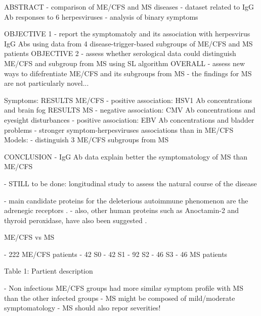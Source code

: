 ABSTRACT
- comparison of ME/CFS and MS diseases
- dataset related to IgG Ab responses to 6 herpesviruses
- analysis of binary symptoms

OBJECTIVE 1
- report the symptomatoly and its association with herpesvirus IgG Abs using data from 4 disease-trigger-based subgroups of ME/CFS and MS patients
OBJECTIVE 2
- assess whether serological data could distinguish ME/CFS and subgroup from MS using SL algorithm
OVERALL
- assess new ways to difefrentiate ME/CFS and its subgroups from MS
- the findings for MS are not particularly novel...


Symptoms:
    RESULTS ME/CFS
    - positive association: HSV1 Ab concentrations and brain fog
    RESULTS MS
    - negative association: CMV Ab concentrations and eyesight disturbances
    - positive association: EBV Ab concentrations and bladder problems
    - stronger symptom-herpesviruses associations than in ME/CFS
Models:
    - distinguish 3 ME/CFS subgroups from MS

CONCLUSION
- IgG Ab data explain better the symptomatology of MS than ME/CFS

- STILL to be done: longitudinal study to assess the natural course of the disease




- main candidate proteins for the deleterious autoimmune phenomenon are the adrenegic receptors \citep{bynke2020AutoantibodiesBetaadrenergic, freitag2021AutoantibodiesVasoregulative, loebel2016AntibodiesAdrenergic}.
- also, other human proteins such as Anoctamin-2 and thyroid peroxidase, have also been suggested \citep{loebel2017SerologicalProfiling, sepulveda2021ImpactGenetic}.

ME/CFS vs MS \citep{loebel2017SerologicalProfiling, ramosRegulatoryNaturalKiller2016}


- 222 ME/CFS patients
    - 42 S0
    - 42 S1
    - 92 S2
    - 46 S3
- 46 MS patients

Table 1: Partient description


- Non infectious ME/CFS groups had more similar symptom profile with MS than the other infected groups
    - MS might be composed of mild/moderate symptomatology
    - MS should also repor severities!

